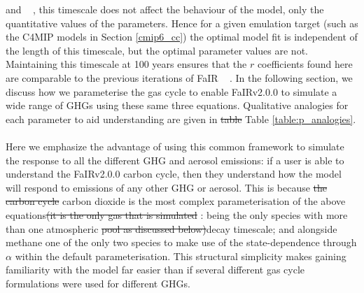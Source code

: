 \documentclass[gmd, manuscript]{copernicus}
\providecommand{\DIFadd}[1]{{\protect\color{blue}#1}} %
\providecommand{\DIFdel}[1]{{\protect\color{red}\sout{#1}}}                      %
\providecommand{\DIFaddbegin}{} %
\providecommand{\DIFaddend}{} %
\providecommand{\DIFdelbegin}{} %
\providecommand{\DIFdelend}{} %
\begin{document}
{{\citet{Millar2016} }\hspace{0pt}%
and \mbox{%
\citet{Joos2013}}\hspace{0pt}%
, this timescale does not affect the behaviour of the model, only the quantitative values of the parameters. Hence for a given emulation target (such as the C4MIP models in Section \ref{cmip6_cc}) the optimal model fit is independent of the length of this timescale, but the optimal parameter values are not. Maintaining this timescale at 100 years ensures that the $r$ coefficients found here are comparable to the previous iterations of FaIR \mbox{%
\citep{Smith2018,Millar2016}}\hspace{0pt}%
. }\DIFaddend In the following section, we discuss how we parameterise the gas cycle to enable FaIRv2.0\DIFaddbegin \DIFadd{.0 }\DIFaddend to simulate a wide range of GHGs using these same three equations. Qualitative analogies for each parameter to aid understanding are given in \DIFdelbegin \DIFdel{table }\DIFdelend \DIFaddbegin \DIFadd{Table }\DIFaddend \ref{table:p_analogies}.\\\\
%
Here we emphasize the advantage of using this common framework to simulate the response to all the different GHG and aerosol emissions: if a user is able to understand the FaIRv2.0\DIFaddbegin \DIFadd{.0 }\DIFaddend carbon cycle, then they understand how the model will respond to emissions of any other GHG or aerosol. This is because \DIFdelbegin \DIFdel{the carbon cycle }\DIFdelend \DIFaddbegin \DIFadd{carbon dioxide }\DIFaddend is the most complex parameterisation of the above equations\DIFdelbegin \DIFdel{(it is the only gas that is simulated }\DIFdelend \DIFaddbegin \DIFadd{: being the only species }\DIFaddend with more than one atmospheric \DIFdelbegin \DIFdel{pool as discussed below)}\DIFdelend \DIFaddbegin \DIFadd{decay timescale; and alongside methane one of the only two species to make use of the state-dependence through $\alpha$ within the default parameterisation}\DIFaddend . This structural simplicity makes gaining familiarity with the model far easier than if several different gas cycle formulations were used for different GHGs.
%
\end{document}
